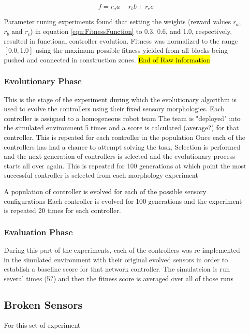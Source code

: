 \documentclass[conference]{IEEEtran}
\DeclareRobustCommand{\hlcyan}[1]{{\sethlcolor{cyan}\hl{#1}}}
\begin{document}
\begin{equation}\label{equ:FitnessFunction}
f = r_a a + r_b b + r_c c
\end{equation}

Parameter tuning experiments found that setting the weights (reward values \(r_a\), \(r_b\) and \(r_c\))
in equation \ref{equ:FitnessFunction} to 0.3, 0.6, and 1.0, respectively, resulted in functional controller evolution.
Fitness was normalized to the range \([0.0, 1.0]\) using the maximum possible fitness yielded from
all blocks being pushed and connected in construction zones.
\hl{End of Raw information}

\subsubsection{Evolutionary Phase}
This is the stage of the experiment during which the evolutionary algorithm is used to evolve the controllers using their fixed sensory morphologies. 
Each controller is assigned to a homogeneous robot team 
The team is "deployed" into the simulated environment 5 times and a score is calculated (average?) for that controller.
This is repeated for each controller in the population 
Once each of the controllers has had a chance to attempt solving the task, Selection is performed and the next generation of controllers is selected and the evolutionary process starts all over again.
This is repeated for 100 generations at which point the most successful controller is selected from each morphology experiment

A population of controller is evolved for each of the possible sensory configurations
Each controller is evolved for 100 generations and the experiment is repeated 20 times for each controller.

\subsubsection{Evaluation Phase}
During this part of the experiments, each of the controllers was re-implemented in the simulated environment with their original evolved sensors in order to establish a baseline score for that network controller.
The simulateion is run several times (5?) and then the fitness score is averaged over all of those runs

\subsection{Broken Sensors}
For this set of experiment
\end{document}
